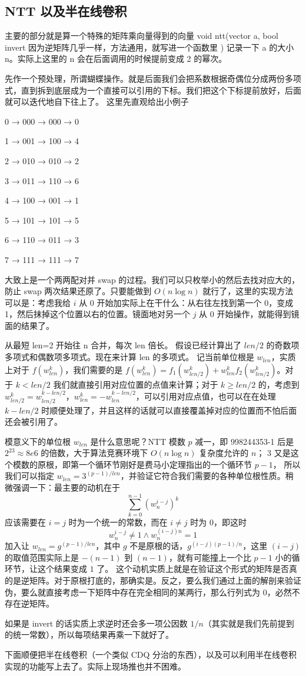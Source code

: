 \subsection{NTT 以及半在线卷积}

主要的部分就是算一个特殊的矩阵乘向量得到的向量
void ntt(vector a, bool invert 因为逆矩阵几乎一样，方法通用，就写进一个函数里 )
记录一下 a 的大小 n。实际上这里的 n 会在后面调用的时候提前变成 2 的幂次。

先作一个预处理，所谓蝴蝶操作。就是后面我们会把系数根据奇偶位分成两份多项式，直到拆到底层成为一个直接可以引用的下标。我们把这个下标提前放好，后面就可以迭代地自下往上了。
这里先直观给出小例子

0 → 000 → 000 → 0  

1 → 001 → 100 → 4  

2 → 010 → 010 → 2  

3 → 011 → 110 → 6  

4 → 100 → 001 → 1  

5 → 101 → 101 → 5  

6 → 110 → 011 → 3  

7 → 111 → 111 → 7

大致上是一个两两配对并 swap 的过程。我们可以只枚举小的然后去找对应大的，防止 swap 两次结果还原了。只要能做到 $O(n\log n)$ 就行了，这里的实现方法可以是：考虑我给 $i$ 从 $0$ 开始加实际上在干什么：从右往左找到第一个 0，变成 1，然后抹掉这个位置以右的位置。镜面地对另一个 $j$ 从 $0$ 开始操作，就能得到镜面的结果了。

从最短 len=2 开始往 n 合并，每次 len 倍长。
假设已经计算出了 $len/2$ 的奇数项多项式和偶数项多项式。现在来计算 len 的多项式。
记当前单位根是 $w_{len}$，实质上对于 $f(w_{len}^{k})$，我们需要的是 $f(w_{len}^{k}) = f_1(w_{len/2}^{k}) +w_{len}^{k}f_2(w_{len/2}^{k})$。对于 $k<len/2$ 我们就直接引用对应位置的点值来计算；对于 $k\ge len/2$ 的，考虑到 $w_{len/2}^{k} = w_{len/2}^{k-len/2}$，$w_{len}^{k} = -w_{len}^{k-len/2}$，可以引用对应点值，也可以在在处理 $k-len/2$ 时顺便处理了，并且这样的话就可以直接覆盖掉对应的位置而不怕后面还会被引用了。

模意义下的单位根 $w_{len}$ 是什么意思呢？NTT 模数 $p$ 减一，即 998244353-1 后是 $2^{23}\approx 8e6$ 的倍数，大于算法竞赛环境下 $O(n\log n)$ 复杂度允许的 $n$；
$3$ 又是这个模数的原根，即第一个循环节刚好是费马小定理指出的一个循环节 $p-1$，
所以我们可以指定 $w_{len} = 3^{(p-1)/len}$，并验证它符合我们需要的各种单位根性质。稍微强调一下：最主要的动机在于
$$
\sum_{k=0}^{n-1}(w_n^{i-j})^{k}
$$
应该需要在 $i=j$ 时为一个统一的常数，而在 $i\not=j$ 时为 $0$，即这时
$$
w_{n}^{i-j}\not= 1 \land w_{n}^{(i-j)n}=1
$$
加入让 $w_{len}=g^{(p-1)/len}$，其中 $g$ 不是原根的话，$g^{(i-j)(p-1)/n}$，这里 $(i-j)$ 的取值范围实际上是 $-(n-1)$ 到 $(n-1)$，就有可能撞上一个比 $p-1$ 小的循环节，让这个结果变成 $1$ 了。
这个动机实质上就是在验证这个形式的矩阵是否真的是逆矩阵。对于原根打底的，那确实是。反之，要么我们通过上面的解剖来验证伪，要么就直接考虑一下矩阵中存在完全相同的某两行，那么行列式为 $0$，必然不存在逆矩阵。


如果是 invert 的话实质上求逆时还会多一项公因数 $1/n$（其实就是我们先前提到的统一常数），所以每项结果再乘一下就好了。

下面顺便把半在线卷积（一个类似 CDQ 分治的东西），以及可以利用半在线卷积实现的功能写上去了。实际上现场推也并不困难。



